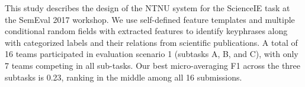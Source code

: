 This study describes the design of the NTNU system for the ScienceIE task at the SemEval 2017 workshop. We use self-defined feature templates and multiple conditional random fields with extracted features to identify keyphrases along with categorized labels and their relations from scientific publications. A total of 16 teams participated in evaluation scenario 1 (subtasks A, B, and C), with only 7 teams competing in all sub-tasks. Our best micro-averaging F1 across the three subtasks is 0.23, ranking in the middle among all 16 submissions.

